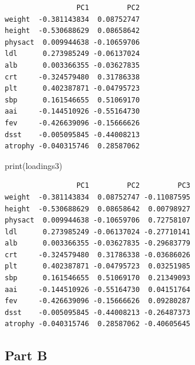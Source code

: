 \documentclass[
  letterpaper,
  DIV=11,
  numbers=noendperiod]{scrartcl}
\newenvironment{Shaded}{}{}
\newcommand{\CommentTok}[1]{\textcolor[rgb]{0.57,0.51,0.45}{#1}}
\newcommand{\FunctionTok}[1]{\textcolor[rgb]{0.41,0.62,0.42}{#1}}
\newcommand{\NormalTok}[1]{\textcolor[rgb]{0.24,0.22,0.21}{#1}}
\newcommand{\OtherTok}[1]{\textcolor[rgb]{0.41,0.62,0.42}{#1}}
\newcommand{\SpecialCharTok}[1]{\textcolor[rgb]{0.69,0.38,0.53}{#1}}
\begin{document}
\begin{verbatim}
                 PC1         PC2
weight  -0.381143834  0.08752747
height  -0.530688629  0.08658642
physact  0.009944638 -0.10659706
ldl      0.273985249 -0.06137024
alb      0.003366355 -0.03627835
crt     -0.324579480  0.31786338
plt      0.402387871 -0.04795723
sbp      0.161546655  0.51069170
aai     -0.144510926 -0.55164730
fev     -0.426639096 -0.15666626
dsst    -0.005095845 -0.44008213
atrophy -0.040315746  0.28587062
\end{verbatim}

\begin{Shaded}
\begin{Highlighting}[]
\FunctionTok{print}\NormalTok{(loadings3)}
\end{Highlighting}
\end{Shaded}

\begin{verbatim}
                 PC1         PC2         PC3
weight  -0.381143834  0.08752747 -0.11087595
height  -0.530688629  0.08658642  0.00798927
physact  0.009944638 -0.10659706  0.72758107
ldl      0.273985249 -0.06137024 -0.27710141
alb      0.003366355 -0.03627835 -0.29683779
crt     -0.324579480  0.31786338 -0.03686026
plt      0.402387871 -0.04795723  0.03251985
sbp      0.161546655  0.51069170  0.21349093
aai     -0.144510926 -0.55164730  0.04151764
fev     -0.426639096 -0.15666626  0.09280287
dsst    -0.005095845 -0.44008213 -0.26487373
atrophy -0.040315746  0.28587062 -0.40605645
\end{verbatim}

\newpage{}

\hypertarget{part-b}{%
\subsection{Part B}\label{part-b}}

\begin{Shaded}
\end{Shaded}
\end{document}
